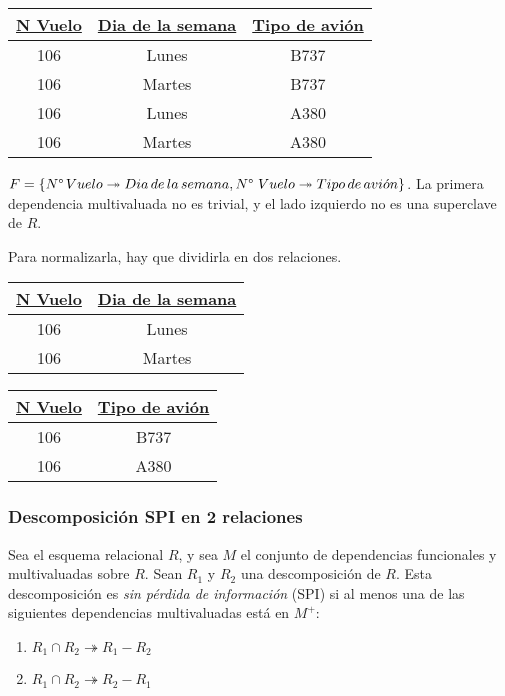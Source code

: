 \documentclass[a4paper, twoside]{article}
\begin{document}
\noindent \begin{center}
\begin{tabular}{|c|c|c|}
\hline 
\uline{N\textdegree{} Vuelo} & \uline{Dia de la semana} & \uline{Tipo de avión}\\
\hline 
\hline 
106 & Lunes & B737\\
\hline 
106 & Martes  & B737\\
\hline 
106 & Lunes & A380\\
\hline 
106 & Martes & A380\\
\hline 
\end{tabular}
\par\end{center}

$F=\left\{ N\text{\textdegree\,}Vuelo\twoheadrightarrow Dia\, de\, la\, semana,N\text{\textdegree\ }Vuelo\twoheadrightarrow Tipo\, de\, avi\acute{o}n\right\} $.
La primera dependencia multivaluada no es trivial, y el lado izquierdo
no es una superclave de $R$.

Para normalizarla, hay que dividirla en dos relaciones.

\noindent \begin{center}
\begin{tabular}{|c|c|}
\hline 
\uline{N\textdegree{} Vuelo} & \uline{Dia de la semana}\\
\hline 
\hline 
106 & Lunes\\
\hline 
106 & Martes \\
\hline 
\end{tabular}%
\begin{tabular}{|c|c|}
\hline 
\uline{N\textdegree{} Vuelo} & \uline{Tipo de avión}\\
\hline 
\hline 
106 & B737\\
\hline 
106 & A380\\
\hline 
\end{tabular}
\par\end{center}


\subsubsection{Descomposición SPI en 2 relaciones}

Sea el esquema relacional $R$, y sea $M$ el conjunto de dependencias
funcionales y multivaluadas sobre $R$. Sean $R_{1}$ y $R_{2}$ una
descomposición de $R$. Esta descomposición es \emph{sin pérdida de
información} (SPI) si al menos una de las siguientes dependencias
multivaluadas está en $M^{+}$:
\begin{enumerate}
\item $R_{1}\cap R_{2}\twoheadrightarrow R_{1}-R_{2}$
\item $R_{1}\cap R_{2}\twoheadrightarrow R_{2}-R_{1}$
\end{enumerate}
\end{document}

